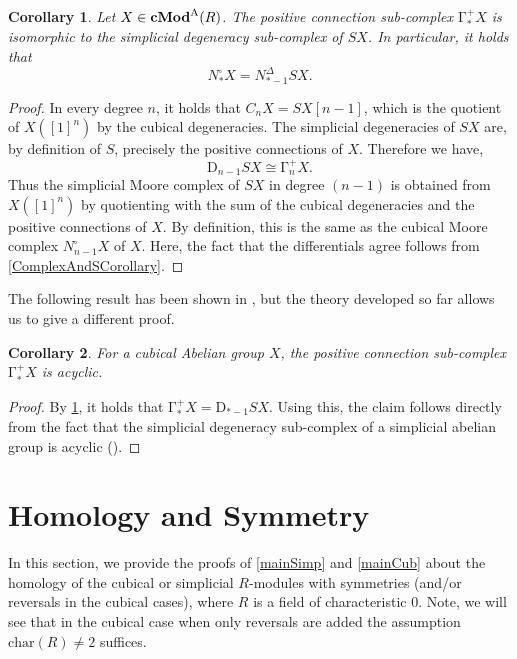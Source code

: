 \documentclass[12pt]{amsart}
\theoremstyle{plain}
\numberwithin{lemma}{\DefaultNumberTheoremWithin}
\numberwithin{claim}{\DefaultNumberTheoremWithin}
\numberwithin{theorem}{\DefaultNumberTheoremWithin}
\newtheorem{corollary}{Corollary}
\numberwithin{corollary}{\DefaultNumberTheoremWithin}
\numberwithin{proposition}{\DefaultNumberTheoremWithin}
\numberwithin{conjecture}{\DefaultNumberTheoremWithin}
\theoremstyle{definition}
\theoremstyle{definition}
\numberwithin{question}{\DefaultNumberTheoremWithin}
\theoremstyle{definition}
\numberwithin{problem}{\DefaultNumberTheoremWithin}
\theoremstyle{remark}
\numberwithin{remark}{\DefaultNumberTheoremWithin}
\theoremstyle{remark}
\numberwithin{example}{\DefaultNumberTheoremWithin}
\def\blt{*}
\def\one{[1]}
\def\Deg{\mathrm{D}}    %
\def\Con{\mathrm{\Gamma}}  %
\def\posCon{\Con^+} %
\newcommand{\cMod}[2]{\mathbf{cMod}^{\textnormal{#1}}(#2)}  %
\newcommand{\SimpMoore}[1]{N_{#1}^\Delta} %
\newcommand{\CubMoore}[1]{N_{#1}^\square} %
\begin{document}
    \begin{corollary}\label{DegUndConComplex}
      Let $X \in \cMod{A}{R}$. The positive connection sub-complex $\posCon_*X$ is iso\-mor\-phic to the simplicial degeneracy sub-complex of $SX$. In  particular, it holds that $$\CubMoore{\blt}X=\SimpMoore{\blt-1}SX.$$
    \end{corollary}
    \begin{proof}
    In every degree $n$, it holds that $C_n X=SX[n-1]$, which is the quotient of $X(\one^n)$ by the cubical degeneracies. The simplicial degeneracies of $SX$ are, by definition of $S$, precisely the positive connections of $X$. Therefore
    we have, $$\Deg_{n-1} SX\cong \posCon_nX.$$
    Thus the simplicial Moore complex of $SX$ in degree $(n-1)$ is obtained from $X(\one^n)$ by quotienting with the sum of the cubical degeneracies and the positive connections of $X$. By definition, this is the same as the cubical Moore complex $\CubMoore{n-1}X$
    of $X$.
    Here, the fact that the differentials agree follows from \ref{ComplexAndSCorollary}.
    \end{proof}
    
    
    The following result has been shown in \cite{HomologyConnections}, but the theory developed so far allows us to give a different proof.
    
    \begin{corollary}
    For a cubical Abelian group $X$, the positive connection sub-complex $\posCon_*X$ is acyclic.
    \end{corollary}
    \begin{proof}
    By \ref{DegUndConComplex}, it holds that $\posCon_*X=\Deg_{\blt-1} SX$. Using this, the claim follows directly from the fact that the simplicial degeneracy sub-complex of a simplicial abelian group is acyclic (\cite[Proof of Theorem 8.3.8]{WeibelBook}).
    \end{proof}


\section{Homology and Symmetry} \label{sec:homology}

In this section, we provide the proofs of \ref{mainSimp} and \ref{mainCub} 
about the homology of the cubical or simplicial $R$-modules with symmetries (and/or reversals in the cubical cases), where $R$ is a field of characteristic $0$. Note, we will see that 
in the cubical case when only reversals are added the
assumption $\text{char}(R)\neq 2$ suffices.
\end{document}
